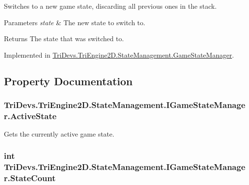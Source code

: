 Switches to a new game state, discarding all previous ones in the stack. 


\begin{DoxyParams}{Parameters}
{\em state} & The new state to switch to.\\
\hline
\end{DoxyParams}
\begin{DoxyReturn}{Returns}
The state that was switched to.
\end{DoxyReturn}


Implemented in \hyperlink{class_tri_devs_1_1_tri_engine2_d_1_1_state_management_1_1_game_state_manager_aaa3ee6d6d5d0901b43b6ce6dec8c95f1}{Tri\-Devs.\-Tri\-Engine2\-D.\-State\-Management.\-Game\-State\-Manager}.



\subsection{Property Documentation}
\hypertarget{interface_tri_devs_1_1_tri_engine2_d_1_1_state_management_1_1_i_game_state_manager_a33956fd836baa4c391631564dcffc579}{
\subsubsection[{Active\-State}]{ Tri\-Devs.\-Tri\-Engine2\-D.\-State\-Management.\-I\-Game\-State\-Manager.\-Active\-State\hspace{0.3cm}{\ttfamily [get]}}}\label{interface_tri_devs_1_1_tri_engine2_d_1_1_state_management_1_1_i_game_state_manager_a33956fd836baa4c391631564dcffc579}


Gets the currently active game state. 

\hypertarget{interface_tri_devs_1_1_tri_engine2_d_1_1_state_management_1_1_i_game_state_manager_a5c55e89438dcacfbc8784bb971796116}{
\subsubsection[{State\-Count}]{\setlength{\rightskip}{0pt plus 5cm}int Tri\-Devs.\-Tri\-Engine2\-D.\-State\-Management.\-I\-Game\-State\-Manager.\-State\-Count\hspace{0.3cm}{\ttfamily [get]}}}\label{interface_tri_devs_1_1_tri_engine2_d_1_1_state_management_1_1_i_game_state_manager_a5c55e89438dcacfbc8784bb971796116}


